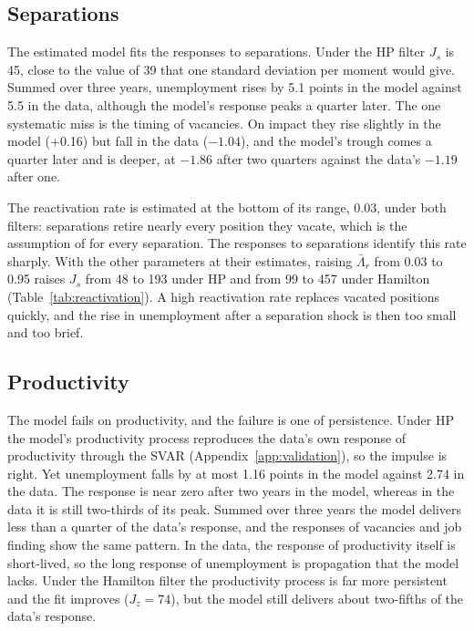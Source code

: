\documentclass[authoryear, review, 12pt]{elsarticle}
\begin{document}
\subsection{Separations}

The estimated model fits the responses to separations. Under the HP filter $J_s$ is 45, close to the value of 39 that one standard deviation per moment would give. Summed over three years, unemployment rises by 5.1 points in the model against 5.5 in the data, although the model's response peaks a quarter later. The one systematic miss is the timing of vacancies. On impact they rise slightly in the model (+0.16) but fall in the data ($-1.04$), and the model's trough comes a quarter later and is deeper, at $-1.86$ after two quarters against the data's $-1.19$ after one.

The reactivation rate is estimated at the bottom of its range, 0.03, under both filters: separations retire nearly every position they vacate, which is the assumption of \citet{coles_2018} for every separation. The responses to separations identify this rate sharply. With the other parameters at their estimates, raising $\bar\Lambda_r$ from 0.03 to 0.95 raises $J_s$ from 48 to 193 under HP and from 99 to 457 under Hamilton (Table~\ref{tab:reactivation}). A high reactivation rate replaces vacated positions quickly, and the rise in unemployment after a separation shock is then too small and too brief.

\subsection{Productivity}

The model fails on productivity, and the failure is one of persistence. Under HP the model's productivity process reproduces the data's own response of productivity through the SVAR (Appendix~\ref{app:validation}), so the impulse is right. Yet unemployment falls by at most 1.16 points in the model against 2.74 in the data. The response is near zero after two years in the model, whereas in the data it is still two-thirds of its peak. Summed over three years the model delivers less than a quarter of the data's response, and the responses of vacancies and job finding show the same pattern. In the data, the response of productivity itself is short-lived, so the long response of unemployment is propagation that the model lacks. Under the Hamilton filter the productivity process is far more persistent and the fit improves ($J_z=74$), but the model still delivers about two-fifths of the data's response.
\end{document}
